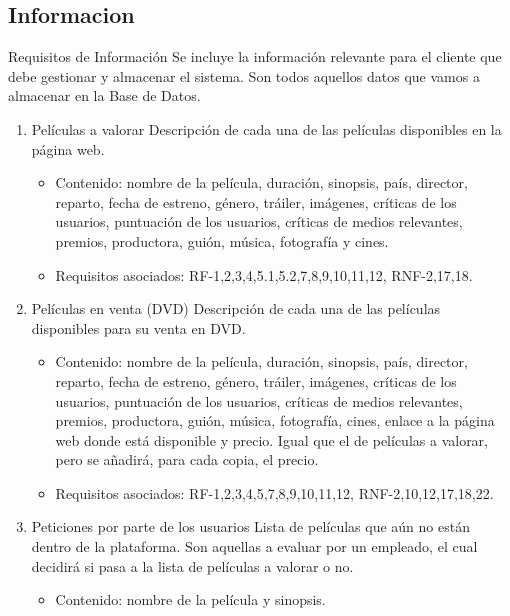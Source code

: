 \documentclass{article}
\begin{document}
    \subsection{Informacion}
    Requisitos de Información Se incluye la información relevante para el cliente que debe gestionar y almacenar el sistema. Son todos aquellos datos que vamos a almacenar en la Base de Datos.
    \begin{enumerate}[label=\bfseries RI- \arabic*:]

    \item Películas a valorar Descripción de cada una de las películas disponibles en la página web.
        \begin{itemize}
        \item Contenido: nombre de la película, duración, sinopsis, país, director, reparto, fecha de estreno, género, tráiler, imágenes, críticas de los usuarios, puntuación de los usuarios, críticas de medios relevantes, premios, productora, guión, música, fotografía y cines.

        \item Requisitos asociados: RF-1,2,3,4,5.1,5.2,7,8,9,10,11,12, RNF-2,17,18.
        \end{itemize}
    \item Películas en venta (DVD) Descripción de cada una de las películas disponibles para su venta en DVD.
        \begin{itemize}
        \item Contenido: nombre de la película, duración, sinopsis, país, director, reparto, fecha de estreno, género, tráiler, imágenes, críticas de los usuarios, puntuación de los usuarios, críticas de medios relevantes, premios, productora, guión, música, fotografía, cines, enlace a la página web donde está disponible y precio. Igual que el de películas a valorar, pero se añadirá, para cada copia, el precio.

        \item Requisitos asociados: RF-1,2,3,4,5,7,8,9,10,11,12, RNF-2,10,12,17,18,22.
        \end{itemize}
    \item Peticiones por parte de los usuarios Lista de películas que aún no están dentro de la plataforma. Son aquellas a evaluar por un empleado, el cual decidirá si pasa a la lista de películas a valorar o no.
        \begin{itemize}
        \item Contenido: nombre de la película y sinopsis.


\end{itemize}
\end{enumerate}
\end{document}
